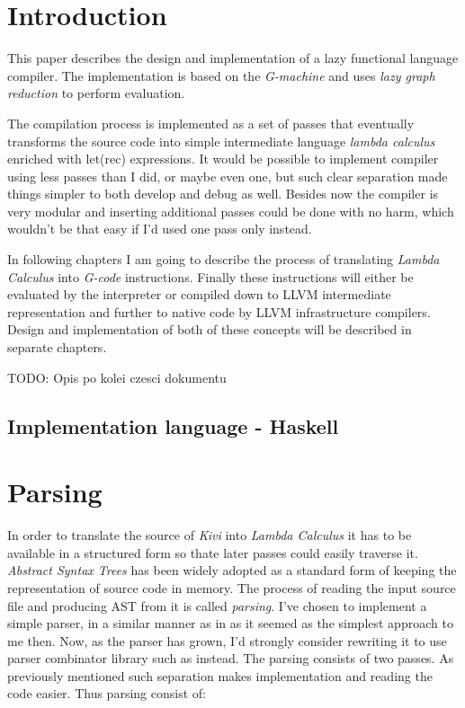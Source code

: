 \documentclass[a4paper]{report}
\begin{document}
\normalsize
{}

\tableofcontents

\chapter{Introduction}

This paper describes the design and implementation of a lazy functional
language compiler. The implementation is based on the
\textit{G-machine}\cite{jones87} and uses \textit{lazy graph reduction} to
perform evaluation.

The compilation process is implemented as a set of passes that eventually
transforms the source code into simple intermediate language \textit{lambda
calculus} enriched with let(rec) expressions. It would be possible to implement
compiler using less passes than I did, or maybe even one, but such clear
separation made things simpler to both develop and debug as well. Besides now
the compiler is very modular and inserting additional passes could be done with
no harm, which wouldn't be that easy if I'd used one pass only instead.


In following chapters I am going to describe the process of translating
\textit{Lambda Calculus} into \textit{G-code} instructions.  Finally these
instructions will either be evaluated by the interpreter or compiled down to
LLVM intermediate representation and further to native code by LLVM
infrastructure compilers. Design and implementation of both of these concepts
will be described in separate chapters.

TODO: Opis po kolei czesci dokumentu

\section{Implementation language - Haskell}

\chapter{Parsing}

In order to translate the source of \textit{Kivi} into \textit{Lambda Calculus}
it has to be available in a structured form so thate later passes could easily
traverse it. \textit{Abstract Syntax Trees}\cite{wiki:ast} has been widely adopted as a
standard form of keeping the representation of source code in memory. The
process of reading the input source file and producing AST from it is called
\textit{parsing}.
I've chosen to implement a simple parser, in a similar manner as in
\cite{joneslester00} as it seemed as the simplest approach to me then. Now, as
the parser has grown, I'd strongly consider rewriting it to use parser combinator
library such as \cite{website:parsec} instead.  The parsing consists of two
passes. As previously mentioned such separation makes implementation and
reading the code easier. Thus parsing consist of:
\end{document}
